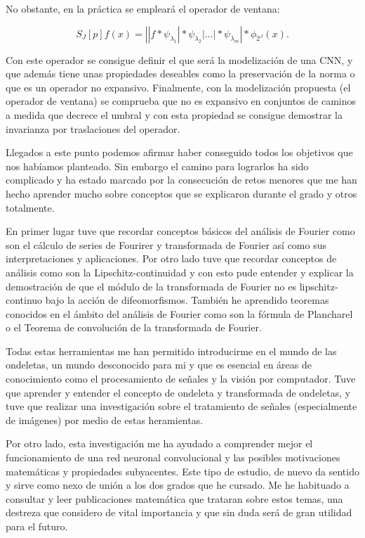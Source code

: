 \medskip

\noindent No obstante, en la práctica se empleará el operador de ventana:

\begin{equation}
  S_J[p]f(x)=\left| |f \ast \psi_{\lambda_1} | \ast \psi_{\lambda_2} | \ldots | \ast \psi_{\lambda_m} \right| \ast \phi_{2^J}(x).
\end{equation}

\noindent Con este operador se consigue definir el que será la modelización de una CNN, y que además tiene unas propiedades deseables como la preservación de la norma o que es un operador no expansivo. Finalmente, con la modelización propuesta (el operador de ventana) se comprueba que no es expansivo en conjuntos de caminos a medida que decrece el umbral y con esta propiedad se consigue demostrar la invarianza por traslaciones del operador.

\medskip

\noindent Llegados a este punto podemos afirmar haber conseguido todos los objetivos que nos habíamos planteado. Sin embargo el camino para lograrlos ha sido complicado y ha estado marcado por la consecución de retos menores que me han hecho aprender mucho sobre conceptos que se explicaron durante el grado y otros totalmente.

\medskip

\noindent En primer lugar tuve que recordar conceptos básicos del análisis de Fourier como son el cálculo de series de Fourirer y transformada de Fourier así como sus interpretaciones y aplicaciones. Por otro lado tuve que recordar conceptos de análisis como son la Lipschitz-continuidad y con esto pude entender y explicar la demostración de que el módulo de la transformada de Fourier no es lipschitz-continuo bajo la acción de difeomorfismos. También he aprendido teoremas conocidos en el ámbito del análisis de Fourier como son la fórmula de Plancharel o el Teorema de convolución de la transformada de Fourier. 

\medskip

\noindent Todas estas herramientas me han permitido introducirme en el mundo de las ondeletas, un mundo desconocido para mi y que es esencial en áreas de conocimiento como el procesamiento de señales y la visión por computador. Tuve que aprender y entender el concepto de ondeleta y transformada de ondeletas, y tuve que realizar una investigación sobre el tratamiento de señales (especialmente de imágenes) por medio de estas heramientas.

\medskip

\noindent Por otro lado, esta investigación me ha ayudado a comprender mejor el funcionamiento de una red neuronal convolucional y las posibles motivaciones matemáticas y propiedades subyacentes. Este tipo de estudio, de nuevo da sentido y sirve como nexo de unión a los dos grados que he cursado. Me he habituado a consultar y leer publicaciones matemática que trataran sobre estos temas, una destreza que considero de vital importancia y que sin duda será de gran utilidad para el futuro.

\endinput